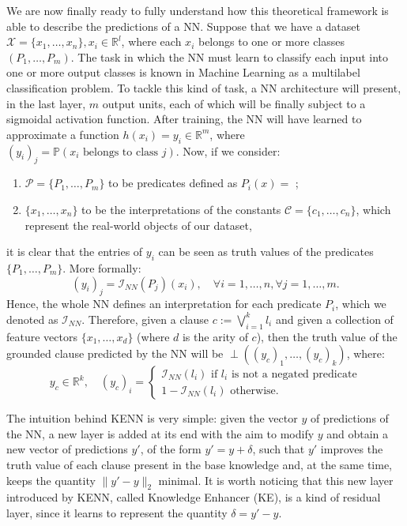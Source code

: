 We are now finally ready to fully understand how this theoretical framework is able to describe the predictions of a NN. Suppose that we have a dataset $\mathcal{X}=\{x_1, \dots, x_n\}, x_i\in\mathbb{R}^l$, where each $x_i$ belongs to one or more classes $\left( P_1, \dots, P_m \right)$. The task in which the NN must learn to classify each input into one or more output classes is known  in Machine Learning as a multilabel classification problem. To tackle this kind of task, a NN architecture will present, in the last layer, $m$ output units, each of which will be finally subject to a sigmoidal activation function. After training, the NN will have learned to approximate a function $h(x_i) = y_i \in \mathbb{R}^m$, where $(y_i)_j = \mathbb{P}(x_i\text{ belongs to class }j).$ Now, if we consider:
\begin{enumerate}
	\item $\mathcal{P} = \{P_1,\dots,P_m\}$ to be predicates defined as $P_i(x) = $ ;
	\item $\{x_1,\dots, x_n\}$ to be the interpretations of the constants $\mathcal{C} = \{c_1,\dots,c_n\}$, which represent the real-world objects of our dataset,
\end{enumerate}  it is clear that the entries of $y_i$ can be seen as truth values of the predicates $\{P_1,\dots,P_m\}$. More formally:
\begin{equation}
(y_i)_j = \mathcal{I}_{NN}(P_j)(x_i), \quad \forall i=1,\dots,n, \forall j=1,\dots,m.
\end{equation}
Hence, the whole NN defines an interpretation for each predicate $P_i$, which we denoted as $\mathcal{I}_{NN}$. Therefore, given a clause $c := \bigvee_{i=1}^k l_i$ and given a collection of feature vectors $\{x_1,\dots,x_d\}$  (where $d$ is the arity of $c$), then the truth value of the grounded clause predicted by the NN will be $\perp((y_c)_1,\dots,(y_c)_k)$, where:
\begin{equation}
\label{eq:yc}
y_c \in \mathbb{R}^k, \quad(y_c)_i = \begin{cases}
\mathcal{I}_{NN}(l_i) \text{ if } l_i \text{ is not a negated predicate}\\
1-\mathcal{I}_{NN}(l_i) \text{ otherwise.}
\end{cases}
\end{equation}

The intuition behind KENN is very simple: given the vector $y$ of predictions of the NN, a new layer is added at its end with the aim to modify $y$ and obtain a new vector of predictions $y'$, of the form $y'=y+\delta$, such that $y'$ improves the truth value of each clause present in the base knowledge and, at the same time, keeps the quantity $\|y'-y\|_2$ minimal. It is worth noticing that this new layer introduced by KENN, called Knowledge Enhancer (KE), is a kind of residual layer, since it learns to represent the quantity $\delta = y'-y$.

